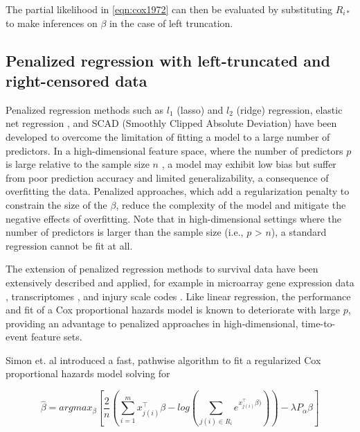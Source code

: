 \documentclass[11pt,final,fleqn]{article}\usepackage[]{graphicx}\usepackage[]{color}
\theoremstyle{plain}
\begin{document}
The partial likelihood in \autoref{eqn:cox1972} can then be evaluated by substituting $R_{i\ast}$ to make inferences on $\beta$ in the case of left truncation. 

\subsection{Penalized regression with left-truncated and right-censored data}
Penalized regression methods such as $l_1$ (lasso) \cite{tibshirani1996regression} and $l_2$ (ridge) \cite{tikhonov1963ridge} regression, elastic net regression \cite{zou2005regularization}, and SCAD (Smoothly Clipped Absolute Deviation) \cite{xie2009scad} have been developed to overcome the limitation of fitting a model to a large number of predictors. In a high-dimensional feature space, where the number of predictors $p$ is large relative to the sample size $n$ , a model may exhibit low bias but suffer from poor prediction accuracy and limited generalizability, a consequence of overfitting the data. Penalized approaches, which add a regularization penalty to constrain the size of the $\beta$, reduce the complexity of the model and mitigate the negative effects of overfitting. Note that in high-dimensional settings where the number of predictors is larger than the sample size (i.e., $p$ > $n$), a standard regression cannot be fit at all.

The extension of penalized regression methods to survival data have been extensively described and applied, for example in microarray gene expression data \cite{gui2005penalized}, transcriptomes \cite{wu2011penalized}, and injury scale codes \cite{mittal2013penalized}. Like linear regression, the performance and fit of a Cox proportional hazards model is known to deteriorate with large $p$, providing an advantage to penalized approaches in high-dimensional, time-to-event feature sets.

Simon et. al\cite{simon2011regularization} introduced a fast, pathwise algorithm to fit a regularized Cox proportional hazards model solving for 

\begin{equation} \label{eqn:simon}
\hat{\beta} = argmax_{\beta}  \left[ \frac{2}{n} \left( \sum_{i=1}^m x_{j(i)}^\intercal\beta - log\left(\sum_{j(i)\in R_i}  e^{x_{j(i)}^\intercal\beta)}\right) \right)  - \lambda P_{\alpha}\beta  \right] 
\end{equation}
\end{document}

